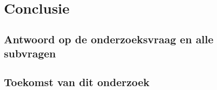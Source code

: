 
\chapter{Conclusie}%
\label{ch:conclusie}


\section{Antwoord op de onderzoeksvraag en alle subvragen}%
\label{Antwoord onderzoeksvraag en subvragen}

\section{Toekomst van dit onderzoek}%
\label{Toekomst van dit onderzoek}

\newpage

